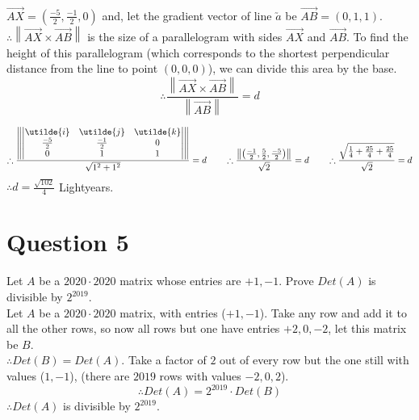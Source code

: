 \documentclass[12pt]{article}
\newcommand{\norm}[1]{\left\lVert#1\right\rVert}
\begin{document}
 \\
$\overrightarrow{AX}=\left(\frac{-5}{2}, \frac{-1}{2}, 0\right)$
and, let the gradient vector of line $\utilde{a}$ be $\overrightarrow{AB}=(0, 1, 1)$. \\
$\therefore \norm{\overrightarrow{AX} \times \overrightarrow{AB}}$ is the size of a parallelogram with sides $\overrightarrow{AX}$ and $\overrightarrow{AB}$.
To find the height of this parallelogram (which corresponds to the shortest perpendicular distance from the line to point $(0, 0 ,0)$), we can divide this area by the base.
$$
\therefore \frac{\norm{\overrightarrow{AX} \times \overrightarrow{AB}}}{\norm{\overrightarrow{AB}}} = d
$$

$$
\therefore 
\frac{
\norm{\begin{vmatrix}
   \utilde{i} & \utilde{j} & \utilde{k}\\
   \frac{-5}{2} & \frac{-1}{2} & 0\\
   0 & 1 & 1\\
\end{vmatrix}
}
}{\sqrt{1^2+1^2}}=d
\hspace{20px}
\therefore
\frac{
\norm{\left(\frac{-1}{2}, \frac{5}{2}, \frac{-5}{2}\right)}
}{\sqrt{2}}=d
\hspace{20px}
\therefore
\frac{\sqrt{\frac{1}{4} + \frac{25}{4} + \frac{25}{4}}}{\sqrt{2}}=d
$$
$
\therefore
d=\frac{\sqrt{102}}{4}
$ Lightyears.
\section*{Question 5}
Let $A$ be a $2020\cdot 2020$ matrix whose entries are $+1, -1$. Prove $Det(A)$ is divisible by $2^{2019}$.\\
Let $A$ be a $2020\cdot 2020$ matrix, with entries ($+1, -1$).
Take any row and add it to all the other rows, so now all rows but one have entries $+2, 0, -2$, let this matrix be $B$.\\
$\therefore Det(B)=Det(A)$. Take a factor of $2$ out of every row but the one still with values ($1, -1$), (there are $2019$ rows with values $-2, 0, 2$).
$$\therefore Det(A)=2^{2019}\cdot Det(B)$$ 
$\therefore Det(A)$ is divisible by $2^{2019}$.
\end{document}
